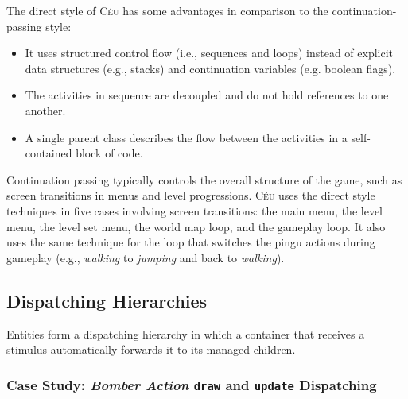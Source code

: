 \documentclass{vgtc}                          %
\newcommand{\CEU}{\textsc{C\'{e}u}\xspace}
\newcommand{\Code}[1] {{\texttt{#1}}}
\begin{document}
The direct style of \CEU has some advantages in comparison to the 
continuation-passing style:
%
\begin{itemize}
\item It uses structured control flow (i.e., sequences and loops) instead of 
      explicit data structures (e.g., stacks) and continuation variables (e.g.
      boolean flags).
\item The activities in sequence are decoupled and do not hold references to
      one another. %
\item A single parent class describes the flow between the activities in a 
      self-contained block of code. %
\end{itemize}

Continuation passing typically controls the overall structure of the game,
such as screen transitions in menus and level progressions.
%
\CEU uses the direct style techniques in five cases involving screen
transitions:
the main menu, the level menu, the level set menu, the world map loop, and
the gameplay loop.
%
It also uses the same technique for the loop that switches the pingu actions
during gameplay (e.g., \emph{walking} to \emph{jumping} and back to
\emph{walking}).

\subsection{Dispatching Hierarchies}
\label{sec.pats.dispatching}

    Entities form a dispatching hierarchy in which a container that receives a
    stimulus automatically forwards it to its managed children.

\subsubsection{Case Study: \emph{Bomber Action} \Code{draw} and \Code{update} Dispatching}
\end{document}
